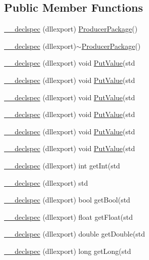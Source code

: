 \subsection*{Public Member Functions}
\begin{DoxyCompactItemize}
\item 
\hyperlink{class_producer_package_ae04a98a621fc165f4c6a21a90a462c39}{\-\_\-\-\_\-declspec} (dllexport) \hyperlink{class_producer_package}{Producer\-Package}()
\item 
\hyperlink{class_producer_package_a80f845342ea6b0fff678eb83ec81a1c0}{\-\_\-\-\_\-declspec} (dllexport)$\sim$\hyperlink{class_producer_package}{Producer\-Package}()
\item 
\hyperlink{class_producer_package_ab8110dbdeb12b6d56cfd84c7e724fa74}{\-\_\-\-\_\-declspec} (dllexport) void \hyperlink{_producer_package_8cpp_abc6c4073e2066f771dc3142734aaef28}{Put\-Value}(std
\item 
\hyperlink{class_producer_package_ab8110dbdeb12b6d56cfd84c7e724fa74}{\-\_\-\-\_\-declspec} (dllexport) void \hyperlink{_producer_package_8cpp_abc6c4073e2066f771dc3142734aaef28}{Put\-Value}(std
\item 
\hyperlink{class_producer_package_ab8110dbdeb12b6d56cfd84c7e724fa74}{\-\_\-\-\_\-declspec} (dllexport) void \hyperlink{_producer_package_8cpp_abc6c4073e2066f771dc3142734aaef28}{Put\-Value}(std
\item 
\hyperlink{class_producer_package_ab8110dbdeb12b6d56cfd84c7e724fa74}{\-\_\-\-\_\-declspec} (dllexport) void \hyperlink{_producer_package_8cpp_abc6c4073e2066f771dc3142734aaef28}{Put\-Value}(std
\item 
\hyperlink{class_producer_package_ab8110dbdeb12b6d56cfd84c7e724fa74}{\-\_\-\-\_\-declspec} (dllexport) void \hyperlink{_producer_package_8cpp_abc6c4073e2066f771dc3142734aaef28}{Put\-Value}(std
\item 
\hyperlink{class_producer_package_ab8110dbdeb12b6d56cfd84c7e724fa74}{\-\_\-\-\_\-declspec} (dllexport) void \hyperlink{_producer_package_8cpp_abc6c4073e2066f771dc3142734aaef28}{Put\-Value}(std
\item 
\hyperlink{class_producer_package_a373c5b4768e46f6a3112cc876f51dfd5}{\-\_\-\-\_\-declspec} (dllexport) int get\-Int(std
\item 
\hyperlink{class_producer_package_aa84d2603598a742dba8a3496e7cbefbc}{\-\_\-\-\_\-declspec} (dllexport) std
\item 
\hyperlink{class_producer_package_a9d34fc5ba49d70dd836021b77477cf89}{\-\_\-\-\_\-declspec} (dllexport) bool get\-Bool(std
\item 
\hyperlink{class_producer_package_a221db83e45bf2d09b9797d25162a426c}{\-\_\-\-\_\-declspec} (dllexport) float get\-Float(std
\item 
\hyperlink{class_producer_package_a399c024c0e554336e5c0369dc7d74461}{\-\_\-\-\_\-declspec} (dllexport) double get\-Double(std
\item 
\hyperlink{class_producer_package_a40658b15d517e4f55bee133bad696814}{\-\_\-\-\_\-declspec} (dllexport) long get\-Long(std
\end{DoxyCompactItemize}

